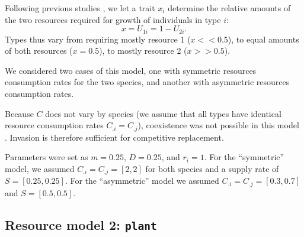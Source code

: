 \documentclass[a4paper,11pt]{article}
\newcommand{\verify}[1]{{\color{navy}{(verify: #1)}}}
\newcommand{\plant}{{\tt plant}}
\begin{document}
\verify{DANIEL : I think we are missing $r_i$ in the equation of the
  resource, I added it back and move it to functional response
  function as this is the most classical way of writting the equations.}

Following previous studies \citep{Tilman-1985, Schreiber-2003, Fox-2008}, we let a trait $x_i$ determine the relative amounts of the two resources required for growth of individuals in type $i$: \begin{equation}
\label{eq:R3}
x = U_{1i} = 1 - U_{2i}.
\end{equation}
Types thus vary from requiring mostly resource 1 ($x << 0.5$), to equal amounts of both resources ($x = 0.5$), to mostly resource 2 ($x >> 0.5$).

We considered two cases of this model, one with symmetric resources consumption
rates for the two species, and another with asymmetric resources
consumption rates.

Because $C$ does not vary by species (we assume that all types have
identical resource consumption rates $C_{.i} = C_{.j}$), coexistence was not possible in this model \citep{Tilman-1982}. Invasion is therefore sufficient for competitive replacement.

Parameters were set as $m = 0.25$, $D=0.25$, and $r_i = 1$. For the ``symmetric'' model, we assumed $C_{.i} = C_{.j} = [2,2]$ for both species and a supply rate of $S = [0.25, 0.25]$.  For the ``asymmetric'' model we assumed $C_{.i} = C_{.j} = [0.3,0.7]$ and $S = [0.5, 0.5]$.

\subsection{Resource model 2: \plant }
\end{document}
